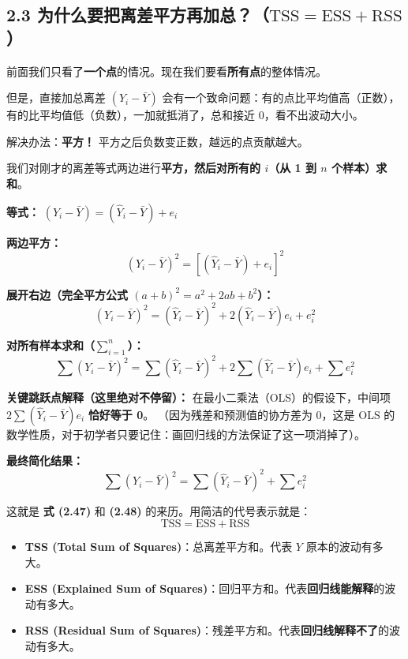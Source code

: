 \documentclass[12pt,a4paper]{article}
\begin{document}
\subsection*{2.3 为什么要把离差平方再加总？（\(\mathrm{TSS} = \mathrm{ESS} + \mathrm{RSS}\)）}

前面我们只看了\textbf{一个点}的情况。现在我们要看\textbf{所有点}的整体情况。

但是，直接加总离差 \((Y_i - \bar{Y})\) 会有一个致命问题：有的点比平均值高（正数），有的比平均值低（负数），一加就抵消了，总和接近 0，看不出波动大小。

解决办法：\textbf{平方！} 平方之后负数变正数，越远的点贡献越大。

我们对刚才的离差等式两边进行\textbf{平方，然后对所有的 \(i\)（从 1 到 \(n\) 个样本）求和}。

\textbf{等式：} \((Y_i - \bar{Y}) = (\hat{Y}_i - \bar{Y}) + e_i\)

\textbf{两边平方：}
\[
(Y_i - \bar{Y})^2 = [(\hat{Y}_i - \bar{Y}) + e_i]^2
\]

\textbf{展开右边（完全平方公式 \((a+b)^2 = a^2 + 2ab + b^2\)）：}
\[
(Y_i - \bar{Y})^2 = (\hat{Y}_i - \bar{Y})^2 + 2(\hat{Y}_i - \bar{Y})e_i + e_i^2
\]

\textbf{对所有样本求和（\(\sum_{i=1}^{n}\)）：}
\[
\sum (Y_i - \bar{Y})^2 = \sum (\hat{Y}_i - \bar{Y})^2 + 2\sum (\hat{Y}_i - \bar{Y})e_i + \sum e_i^2
\]

\textbf{关键跳跃点解释（这里绝对不停留）：} 在最小二乘法（OLS）的假设下，中间项 \(2\sum (\hat{Y}_i - \bar{Y})e_i\) \textbf{恰好等于 0}。
（因为残差和预测值的协方差为 0，这是 OLS 的数学性质，对于初学者只要记住：画回归线的方法保证了这一项消掉了）。

\textbf{最终简化结果：}
\begin{equation}
    \sum (Y_i - \bar{Y})^2 = \sum (\hat{Y}_i - \bar{Y})^2 + \sum e_i^2
\end{equation}

这就是 \textbf{式 (2.47)} 和 \textbf{(2.48)} 的来历。用简洁的代号表示就是：
\begin{equation}
    \mathrm{TSS} = \mathrm{ESS} + \mathrm{RSS}
\end{equation}

\begin{itemize}[itemsep=0pt,topsep=0pt]
    \item \textbf{TSS (Total Sum of Squares)}：总离差平方和。代表 \(Y\) 原本的波动有多大。
    \item \textbf{ESS (Explained Sum of Squares)}：回归平方和。代表\textbf{回归线能解释}的波动有多大。
    \item \textbf{RSS (Residual Sum of Squares)}：残差平方和。代表\textbf{回归线解释不了}的波动有多大。
\end{itemize}
\end{document}
